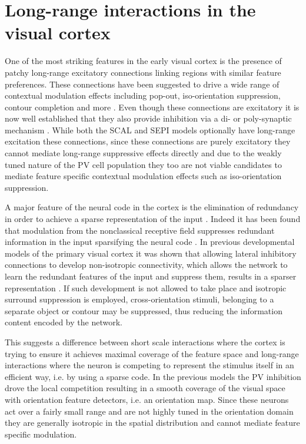 \chapter{Long-range interactions in the visual cortex}

One of the most striking features in the early visual cortex is the
presence of patchy long-range excitatory connections linking regions
with similar feature preferences. These connections have been
suggested to drive a wide range of contextual modulation effects
including pop-out, iso-orientation suppression, contour completion and
more \citep{Gilbert1983, Hirsch1991, McGuire1991, Grinvald1994,
  Fitzpatrick2000, Hupe2001, Stettler2002}. Even though these
connections are excitatory it is now well established that they also
provide inhibition via a di- or poly-synaptic mechanism
\citep{Weliky1995}. While both the SCAL and SEPI models optionally
have long-range excitation these connections, since these connections
are purely excitatory they cannot mediate long-range suppressive
effects directly and due to the weakly tuned nature of the PV cell
population they too are not viable candidates to mediate feature
specific contextual modulation effects such as iso-orientation
suppression.

A major feature of the neural code in the cortex is the elimination of
redundancy in order to achieve a sparse representation of the input
\citep{Olshausen1996}. Indeed it has been found that modulation from
the nonclassical receptive field suppresses redundant information in
the input sparsifying the neural code \citep{Vinje2000}. In previous
developmental models of the primary visual cortex it was shown that
allowing lateral inhibitory connections to develop non-isotropic
connectivity, which allows the network to learn the redundant features
of the input and suppress them, results in a sparser representation
\citep{Miikkulainen2005}. If such development is not allowed to take
place and isotropic surround suppression is employed,
cross-orientation stimuli, belonging to a separate object or contour
may be suppressed, thus reducing the information content encoded by
the network.

This suggests a difference between short scale interactions where the
cortex is trying to ensure it achieves maximal coverage of the feature
space and long-range interactions where the neuron is competing to
represent the stimulus itself in an efficient way, i.e. by using a
sparse code. In the previous models the PV inhibition drove the local
competition resulting in a smooth coverage of the visual space with
orientation feature detectors, i.e. an orientation map. Since these
neurons act over a fairly small range and are not highly tuned in the
orientation domain they are generally isotropic in the spatial
distribution and cannot mediate feature specific modulation.

